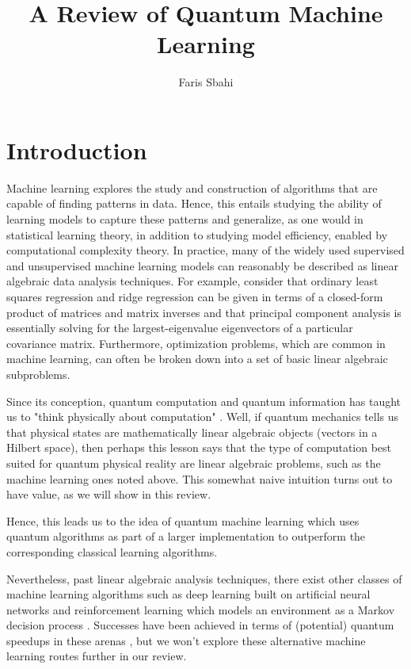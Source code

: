 \documentclass[12]{amsart}
\title[PHY 493 Final Paper]{A Review of Quantum Machine Learning}
\author{Faris Sbahi}
\newcommand\0{\mathbf{0}}
\newcommand\<{\langle}
\renewcommand\>{\rangle}
\begin{document}
\maketitle

\section{Introduction}

Machine learning explores the study and construction of algorithms that are capable of finding patterns in data. Hence, this entails studying the ability of learning models to capture these patterns and generalize, as one would in statistical learning theory, in addition to studying model efficiency, enabled by computational complexity theory. In practice, many of the widely used supervised and unsupervised machine learning models can reasonably be described as linear algebraic data analysis techniques. For example, consider that ordinary least squares regression and ridge regression can be given in terms of a closed-form product of matrices and matrix inverses and that principal component analysis is essentially solving for the largest-eigenvalue eigenvectors of a particular covariance matrix. Furthermore, optimization problems, which are common in machine learning, can often be broken down into a set of basic linear algebraic subproblems.

Since its conception, quantum computation and quantum information has taught us to "think physically about computation" \cite{nielsen2010quantum}. Well, if quantum mechanics tells us that physical states are mathematically linear algebraic objects (vectors in a Hilbert space), then perhaps this lesson says that the type of computation best suited for quantum physical reality are linear algebraic problems, such as the machine learning ones noted above. This somewhat naive intuition turns out to have value, as we will show in this review.

Hence, this leads us to the idea of quantum machine learning which uses quantum algorithms as part of a larger implementation to outperform the corresponding classical learning algorithms.

Nevertheless, past linear algebraic analysis techniques, there exist other classes of machine learning algorithms such as deep learning built on artificial neural networks and reinforcement learning which models an environment as a Markov decision process \cite{sutton1998reinforcement}. Successes have been achieved in terms of (potential) quantum speedups in these arenas \cite{dong2008quantum}, but we won't explore these alternative machine learning routes further in our review. 
\end{document}
